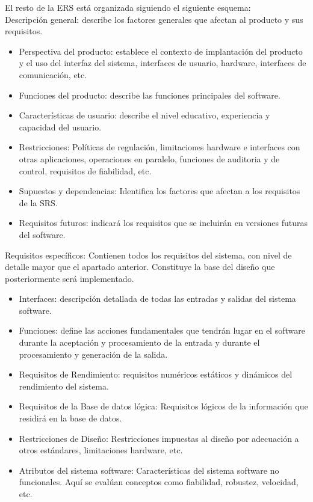 El resto de la ERS está organizada siguiendo el siguiente esquema:\\


{\Large Descripción general:} describe los factores generales que afectan al producto y sus requisitos.
\begin{itemize}
\item Perspectiva del producto: establece el contexto de implantación del producto y el uso del interfaz del sistema, interfaces de usuario, hardware, interfaces de comunicación, etc.
\item Funciones del producto: describe las funciones principales del software.
\item Características de usuario: describe el nivel educativo, experiencia y capacidad del usuario.
\item Restricciones: Políticas de regulación, limitaciones hardware e interfaces con otras aplicaciones, operaciones en paralelo, funciones de auditoria y de control, requisitos de fiabilidad, etc.
\item Supuestos y dependencias: Identifica los factores que afectan a los requisitos de la SRS.
\item Requisitos futuros: indicará los requisitos que se incluirán en versiones futuras del software.
\end{itemize}

{\Large Requisitos específicos:} Contienen todos los requisitos del sistema, con nivel de detalle mayor que el apartado anterior. Constituye la base del diseño que posteriormente será implementado.
\begin{itemize}
\item Interfaces: descripción detallada de todas las entradas y salidas del sistema software.
\item Funciones: define las acciones fundamentales que tendrán lugar en el software durante la aceptación y procesamiento de la entrada y durante el procesamiento y generación de la salida.
\item Requisitos de Rendimiento: requisitos numéricos estáticos y dinámicos del rendimiento del sistema.
\item Requisitos de la Base de datos lógica: Requisitos lógicos de la información que residirá en la base de datos.
\item Restricciones de Diseño: Restricciones impuestas al diseño por adecuación a otros estándares, limitaciones hardware, etc.
\item Atributos del sistema software: Características del sistema software no funcionales. Aquí se evalúan conceptos como fiabilidad, robustez, velocidad, etc.
\end{itemize}
